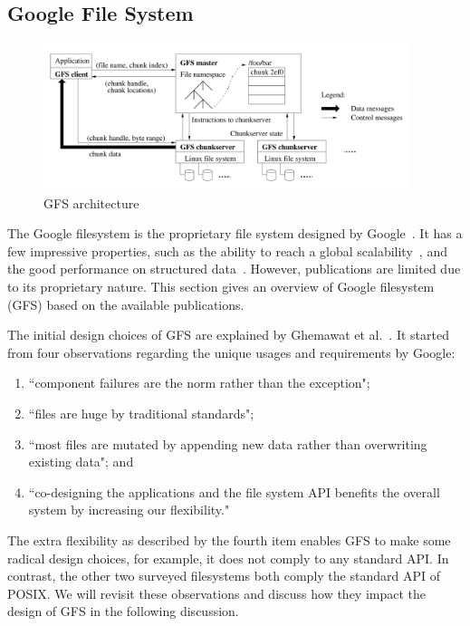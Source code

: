 \subsection{Google File System}
\label{sec:archi_google}
%
\begin{figure}
\centering
\includegraphics[width=0.95\textwidth]{image/gfs_architecture.png}
\caption{GFS architecture}
\label{fig:gfs_architecture}
\end{figure}
%
The Google filesystem is the proprietary file system designed by 
Google~\cite{ghemawat2003google}.
%
It has a few impressive properties, such as the ability to reach a global
scalability~\cite{Ford2010a,Corbett2012a}, and the good performance on 
structured data~\cite{Chang2006a}.
%
However, publications are limited due to its proprietary nature. 
%
This section gives an overview of Google filesystem (GFS) based on the available
publications.

The initial design choices of GFS are explained by 
Ghemawat et al.~\cite{ghemawat2003google}.
%
It started from four observations regarding the unique usages and 
requirements by Google:
%
\begin{enumerate}
\item ``component failures are the norm rather than the exception";
\item ``files are huge by traditional standards";
\item ``most files are mutated by appending new data
		rather than overwriting existing data"; and
\item ``co-designing the applications and the file system API benefits the 
		overall system by increasing our flexibility."
\end{enumerate}
%
The extra flexibility as described by the fourth item enables GFS to 
make some radical design choices, for example, it does not comply to
any standard API.
%
In contrast, the other two surveyed filesystems both comply the 
standard API of POSIX.
%
We will revisit these observations and discuss how they
impact the design of GFS in the following discussion.


